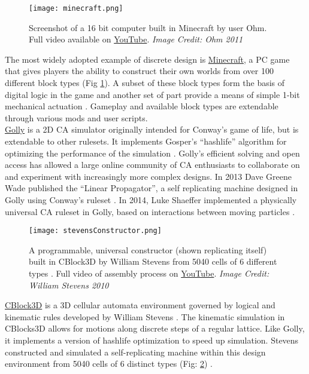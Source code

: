 {\begin{figure}
  \texttt{[image: minecraft.png]}
  \caption{Screenshot of a 16 bit computer built in Minecraft by user Ohm.  Full video available on \href{https://www.youtube.com/watch?v=KzrFzkb3A4o}{YouTube}. \textit{Image Credit: Ohm 2011}}
  \label{fig:minecraft}
\end{figure}

The most widely adopted example of discrete design is \href{https://minecraft.net/}{Minecraft}, a PC game that gives players the ability to construct their own worlds from over 100 different block types (Fig \ref{fig:minecraft}).  A subset of these block types form the basis of digital logic in the game and another set of part provide a means of simple 1-bit mechanical actuation \cite{MinecraftWik2016}.  Gameplay and available block types are extendable through various mods and user scripts.
\\

\href{http://golly.sourceforge.net/}{Golly} is a 2D CA simulator originally intended for Conway's game of life, but is extendable to other rulesets.  It implements Gosper's ``hashlife'' algorithm for optimizing the performance of the simulation \cite{Gosper1984}.  Golly's efficient solving and open access has allowed a large online community of CA enthusiasts to collaborate on and experiment with increasingly more complex designs.  In 2013 Dave Greene Wade published the ``Linear Propagator'', a self replicating machine designed in Golly using Conway's ruleset \cite{Greene2013a}.  In 2014, Luke Shaeffer implemented a physically universal CA ruleset in Golly, based on interactions between moving particles \cite{Shaffer2014}.\\

\begin{figure}
  \texttt{[image: stevensConstructor.png]}
  \caption{A programmable, universal constructor (shown replicating itself) built in CBlock3D by William Stevens from 5040 cells of 6 different types \cite{Stevens2009b}.  Full video of assembly process on  \href{https://www.youtube.com/watch?v=PBXO_6Jn1fs}{YouTube}. \textit{Image Credit: William Stevens 2010}}
  \label{fig:stevensConstructor}
\end{figure}
\href{https://www.youtube.com/watch?feature=player_embedded&v=PBXO_6Jn1fs}{CBlock3D} is a 3D cellular automata environment governed by logical and kinematic rules developed by William Stevens \cite{Stevens2007} \cite{Stevens2009}.  The kinematic simulation in CBlocks3D allows for motions along discrete steps of a regular lattice.  Like Golly, it implements a version of hashlife optimization \cite{Stevens2010} to speed up simulation.  Stevens constructed and simulated a self-replicating machine within this design environment from 5040 cells of 6 distinct types (Fig: \ref{fig:stevensConstructor}) \cite{Stevens2009b}.
\\

}
